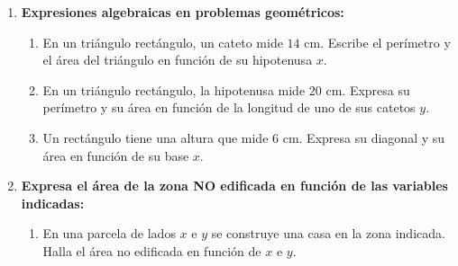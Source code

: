 \documentclass[11pt,a4paper]{article}
\begin{document}
\begin{enumerate}[label=\textbf{\arabic*.}, leftmargin=*]
\begin{enumerate}[label=\alph*), itemsep=1.2em]
            \item $\dfrac{x^2 - 6}{(x - 2)^2} - \dfrac{x - 3}{x - 2}$
            \item $\dfrac{x + 1}{x^2 - 4} \cdot \dfrac{x - 2}{x^2 - 1}$
            \item $\dfrac{3}{x + 2} + \dfrac{2}{x - 2} - \dfrac{8}{x^2 - 4}$
        \end{enumerate}
    \item \textbf{Expresiones algebraicas en problemas geométricos:}
        \begin{enumerate}[label=\alph*), itemsep=0.8em]
            \item En un triángulo rectángulo, un cateto mide $14\text{ cm}$. Escribe el perímetro y el área del triángulo en función de su hipotenusa $x$.
            \item En un triángulo rectángulo, la hipotenusa mide $20\text{ cm}$. Expresa su perímetro y su área en función de la longitud de uno de sus catetos $y$.
            \item Un rectángulo tiene una altura que mide $6\text{ cm}$. Expresa su diagonal y su área en función de su base $x$.
        \end{enumerate}
    \item \textbf{Expresa el área de la zona NO edificada en función de las variables indicadas:}
        \begin{enumerate}[label=\alph*), itemsep=1.5em]
            \item En una parcela de lados $x$ e $y$ se construye una casa en la zona indicada. Halla el área no edificada en función de $x$ e $y$.
            \begin{center}
\end{center}
\end{enumerate}
\end{enumerate}
\end{document}
